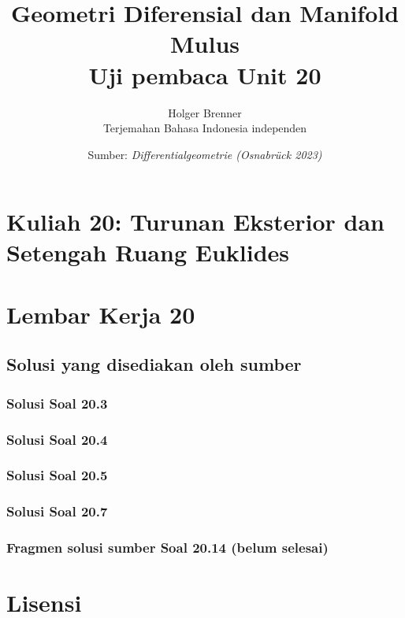 \documentclass[11pt,a4paper,oneside]{book}
\title{Geometri Diferensial dan Manifold Mulus\\\large Uji pembaca Unit 20}
\author{Holger Brenner\\Terjemahan Bahasa Indonesia independen}
\date{Sumber: \textit{Differentialgeometrie (Osnabr\"uck 2023)}}
\begin{document}
\maketitle
\tableofcontents
\mainmatter
\chapter[Kuliah 20]{Kuliah 20: Turunan Eksterior dan Setengah Ruang Euklides}


\chapter{Lembar Kerja 20}


\section*{Solusi yang disediakan oleh sumber}
\subsection*{Solusi Soal 20.3}

\subsection*{Solusi Soal 20.4}

\subsection*{Solusi Soal 20.5}

\subsection*{Solusi Soal 20.7}

\subsection*{Fragmen solusi sumber Soal 20.14 (belum selesai)}


\backmatter
\chapter*{Lisensi}
\Lizenztext
\end{document}
